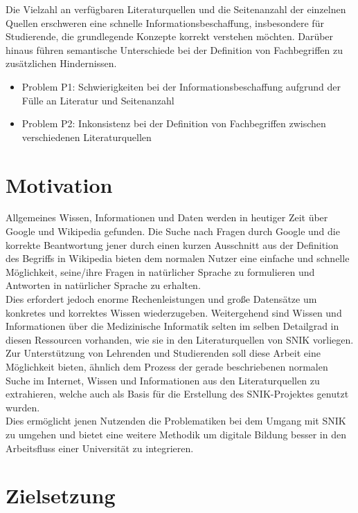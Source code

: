 Die Vielzahl an verfügbaren Literaturquellen und die Seitenanzahl der einzelnen Quellen erschweren eine schnelle Informationsbeschaffung, insbesondere für Studierende, die grundlegende Konzepte korrekt verstehen möchten. 
Darüber hinaus führen semantische Unterschiede bei der Definition von Fachbegriffen zu zusätzlichen Hindernissen.\\

\begin{itemize}
  \item Problem P1: Schwierigkeiten bei der Informationsbeschaffung aufgrund der Fülle an Literatur und Seitenanzahl
  \item Problem P2: Inkonsistenz bei der Definition von Fachbegriffen zwischen verschiedenen Literaturquellen
\end{itemize}

\section{Motivation}

Allgemeines Wissen, Informationen und Daten werden in heutiger Zeit über Google und Wikipedia gefunden. 
Die Suche nach Fragen durch Google und die korrekte Beantwortung jener durch einen kurzen Ausschnitt aus der Definition des Begriffs in Wikipedia bieten dem normalen Nutzer eine einfache und schnelle Möglichkeit, seine/ihre Fragen in natürlicher Sprache zu formulieren und Antworten in natürlicher Sprache zu erhalten.\\

Dies erfordert jedoch enorme Rechenleistungen und große Datensätze um konkretes und korrektes Wissen wiederzugeben. 
Weitergehend sind Wissen und Informationen über die Medizinische Informatik selten im selben Detailgrad in diesen Ressourcen vorhanden, wie sie in den Literaturquellen von SNIK vorliegen. 
Zur Unterstützung von Lehrenden und Studierenden soll diese Arbeit eine Möglichkeit bieten, ähnlich dem Prozess der gerade beschriebenen normalen Suche im Internet, Wissen und Informationen aus den Literaturquellen zu extrahieren, welche auch als Basis für die Erstellung des SNIK-Projektes genutzt wurden.\\

Dies ermöglicht jenen Nutzenden die Problematiken bei dem Umgang mit SNIK zu umgehen und bietet eine weitere Methodik um digitale Bildung besser in den Arbeitsfluss einer Universität zu integrieren.

\section{Zielsetzung}\label{sec:zielsetzung}

